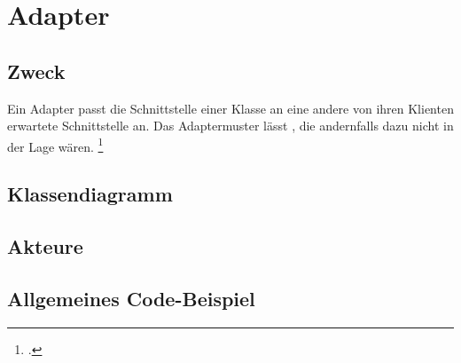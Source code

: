 \documentclass{lehramt-informatik-haupt}
\begin{document}

\chapter{Adapter}

\begin{liQuellen}
\item \cite{wiki:adapter}
\item \cite[Seite 120-129]{gof}
\item \cite[Kapitel 8., Seite 255]{schatten}
\item \cite[Kapitel 5.1, Seite 77-79]{eilebrecht}
\item \cite[Kapitel 20, Seite 243]{siebler}
\end{liQuellen}

\section{Zweck}

Ein Adapter passt die Schnittstelle einer Klasse an eine andere von
ihren Klienten erwartete Schnittstelle an. Das Adaptermuster lässt
, die andernfalls dazu nicht in der Lage
wären.
\footcite[Seite 77]{eilebrecht}

%

\section{Klassendiagramm}

\liEntwurfsAdapterUml

%

\section{Akteure}

\liEntwurfsAdapterAkteure

%

\section{Allgemeines Code-Beispiel}

\liEntwurfsAdapterCode

\literatur
\end{document}
